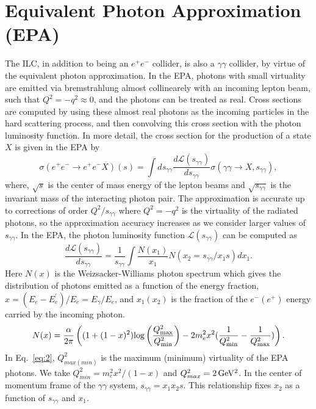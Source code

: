 \documentclass[aps,onecolumn,twoside,secnumarabic,12pt,balancelastpage,amsmath,amssymb,nofootinbib,hyperref=pdftex]{revtex4}
\begin{document}
\section{Equivalent Photon Approximation (EPA)}
The ILC, in addition to being an $e^{+}e^{-}$ collider, is also a $\gamma\gamma$ collider, by virtue of the equivalent photon approximation\cite{Budnev:1974de}. In the EPA, photons with small virtuality are emitted via bremstrahlung almost collinearely with an incoming lepton beam, such that $Q^{2} = -q^{2} \approx 0$, and the photons can be treated as real. Cross sections are computed by using these almost real photons as the incoming particles in the hard scattering process, and then convolving this cross section with the photon luminosity function. 
\vskip 0.12in
In more detail, the cross section for the production of a state $X$ is given in the EPA by
\begin{equation}\label{eq:1}
\sigma(e^{+} e^{-} \rightarrow  e^{+} e^{-} X)(s)= \int ds_{\gamma\gamma}\frac{d\mathcal{L}(s_{\gamma\gamma})}{d s_{\gamma\gamma}}\sigma(\gamma\gamma \rightarrow X, s_{\gamma\gamma}),
\end{equation}
where, $\sqrt{s}$ is the center of mass energy of the lepton beams and $\sqrt{s_{\gamma\gamma}}$ is the invariant mass of the interacting photon pair. The approximation is accurate up to corrections of order $Q^{2}/s_{\gamma\gamma}$ where $Q^{2} = - q^{2}$ is the virtuality of the radiated photons, so the approximation accuracy increases as we consider larger values of $s_{\gamma\gamma}$. In the EPA, the photon luminosity function $\mathcal{L}(s_{\gamma\gamma})$ can be computed as
\begin{equation}\label{eq:2}
\frac{d\mathcal{L}(s_{\gamma\gamma})}{d s_{\gamma\gamma}} = \frac{1}{s_{\gamma\gamma}}\int \frac{N(x_{1})}{x_{1}} N(x_{2} = s_{\gamma\gamma}/x_{1}s)dx_{1}.
\end{equation}
Here $N(x)$ is the Weizsacker-Williams photon spectrum which gives the distribution of photons emitted as a function of the energy fraction, $x = (E_{e} - E^{'}_{e})/E_{e} = E_{\gamma}/E_{e}$, and $x_{1}(x_{2})$ is the fraction of the $e^{-}(e^{+})$ energy carried by the incoming photon.
\begin{equation}\label{eq:3}
N(x) = \frac{\alpha}{2\pi}\left( (1 + (1 - x)^{2})\text{log}\left( \frac{Q^{2}_{\rm{max}}}{Q^{2}_{\rm{min}}}\right) - 2m^{2}_{e}x^{2}(\frac{1}{Q^{2}_{\rm{min}}} - \frac{1}{Q^{2}_{\rm{max}}}) \right).
\end{equation}
\vskip 0.12in
In Eq.~\ref{eq:2}, $Q^{2}_{max(min)}$ is the maximum (minimum) virtuality of the EPA photons. We take $Q^{2}_{min} = m_{e}^{2}x^{2}/(1 - x)$ and $Q^{2}_{max} = 2\,\rm{GeV^{2}}$. In the center of momentum frame of the $\gamma\gamma$ system, $s_{\gamma\gamma} = x_{1}x_{2}s$. This relationship fixes $x_{2}$ as a function of $s_{\gamma\gamma}$ and $x_{1}$. 
\end{document}
